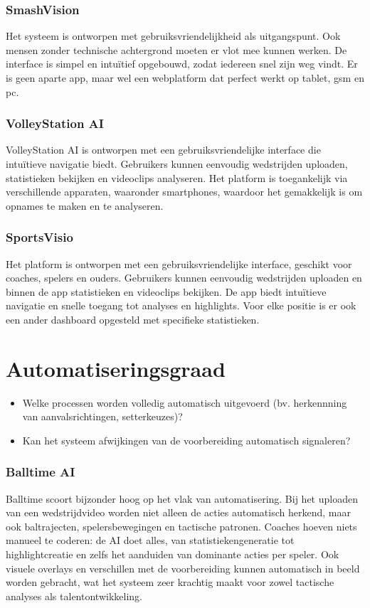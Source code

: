 \subsubsection{SmashVision}
Het systeem is ontworpen met gebruiksvriendelijkheid als uitgangspunt. Ook mensen zonder technische achtergrond moeten er vlot mee kunnen werken. De interface is simpel en intuïtief opgebouwd, zodat iedereen snel zijn weg vindt. Er is geen aparte app, maar wel een webplatform dat perfect werkt op tablet, gsm en pc.
\subsubsection{VolleyStation AI}
VolleyStation AI is ontworpen met een gebruiksvriendelijke interface die intuïtieve navigatie biedt. Gebruikers kunnen eenvoudig wedstrijden uploaden, statistieken bekijken en videoclips analyseren. Het platform is toegankelijk via verschillende apparaten, waaronder smartphones, waardoor het gemakkelijk is om opnames te maken en te analyseren. 
\subsubsection{SportsVisio}
Het platform is ontworpen met een gebruiksvriendelijke interface, geschikt voor coaches, spelers en ouders. Gebruikers kunnen eenvoudig wedstrijden uploaden en binnen de app statistieken en videoclips bekijken. De app biedt intuïtieve navigatie en snelle toegang tot analyses en highlights. Voor elke positie is er ook een ander dashboard opgesteld met specifieke statistieken.

\section{Automatiseringsgraad}
\begin{itemize}
  \item Welke processen worden volledig automatisch uitgevoerd (bv. herkennning van aanvalsrichtingen, setterkeuzes)?
  \item Kan het systeem afwijkingen van de voorbereiding automatisch signaleren?
\end{itemize}
\subsubsection{Balltime AI}
Balltime scoort bijzonder hoog op het vlak van automatisering. Bij het uploaden van een wedstrijdvideo worden niet alleen de acties automatisch herkend, maar ook baltrajecten, spelersbewegingen en tactische patronen. Coaches hoeven niets manueel te coderen: de AI doet alles, van statistiekengeneratie tot highlightcreatie en zelfs het aanduiden van dominante acties per speler. Ook visuele overlays en verschillen met de voorbereiding kunnen automatisch in beeld worden gebracht, wat het systeem zeer krachtig maakt voor zowel tactische analyses als talentontwikkeling.
